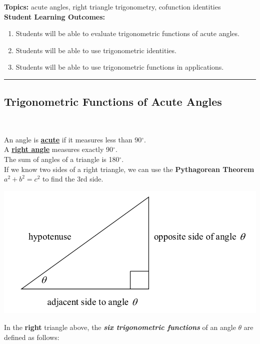
\noindent \textbf{Topics:}  acute angles, right triangle trigonometry, cofunction identities\\

\noindent \textbf{Student Learning Outcomes:}
\begin{enumerate}
\item Students will be able to evaluate trigonometric functions of acute angles.
\item Students will be able to use trigonometric identities.
\item Students will be able to use trigonometric functions in applications.
\end{enumerate}

\hrule 

\bigskip

\subsection{Trigonometric Functions of Acute Angles} ~

\noindent An angle is \textbf{\underline{acute}} if it measures less than 90$^{\circ}$.\\
A \textbf{\underline{right angle}} measures exactly 90$^{\circ}$.\\
The sum of angles of a triangle is 180$^{\circ}$.\\[.2in]

\noindent If we know two sides of a right triangle, we can use the \textbf{Pythagorean Theorem} $a^2+b^2=c^2$ to find the 3rd side.

\begin{center}
\includegraphics[scale=.6]{righttriangle}\\
\end{center}


In the \textbf{right} triangle above, the \textbf{\emph{six trigonometric functions}} of an angle $\theta$ are defined as follows:

